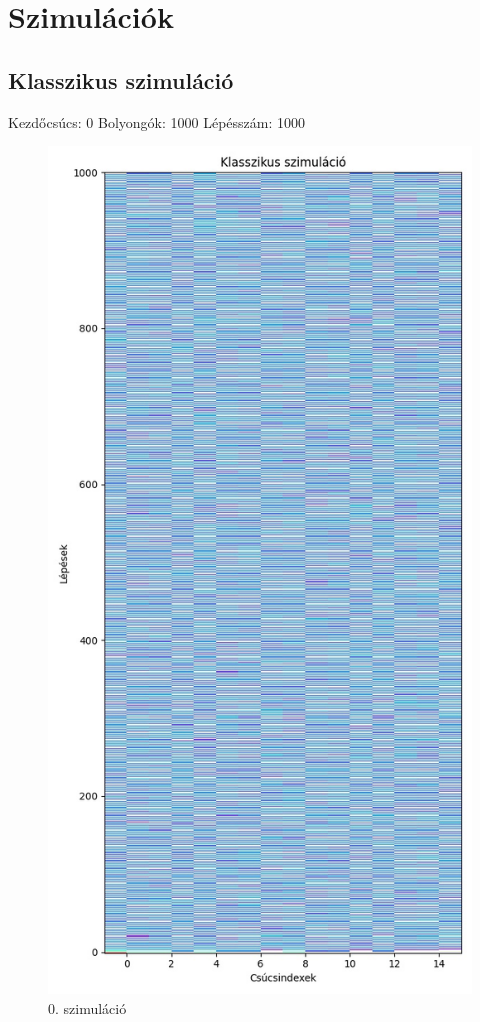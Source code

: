 \documentclass[14pt,a4paper]{article}
\begin{document}
\section{Szimulációk}
\subsection{Klasszikus szimuláció}
Kezdőcsúcs: 0
Bolyongók: 1000
Lépésszám: 1000
\begin{figure}[H]
\centering
\includegraphics[width = 0.7\columnwidth]{sim_00/counts.jpg}
\caption{0. szimuláció}
\end{figure}
\end{document}
